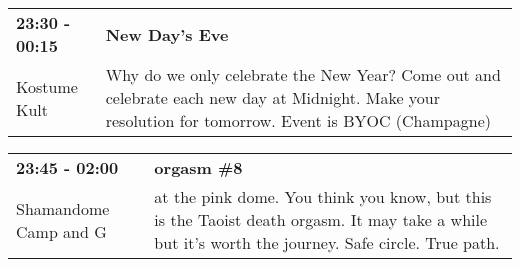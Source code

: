 \begin{tabular}{ p{1in} p{2.2in} }
    \textbf{23:30 - 00:15} & \textbf{New Day's Eve} \\
    Kostume Kult \newline  & Why do we only celebrate the New Year?  Come out and celebrate each new day at Midnight. Make your resolution for tomorrow.  Event is BYOC (Champagne) \\
    \hline 
\end{tabular}
    
\begin{tabular}{ p{1in} p{2.2in} }
    \textbf{23:45 - 02:00} & \textbf{orgasm \#8} \\
    Shamandome Camp \newline 615 and G & at the pink dome. You think you know,  but this is the Taoist death orgasm.  It may take a while but it's worth the journey. Safe circle. True path. \\
    \hline 
\end{tabular}
    
